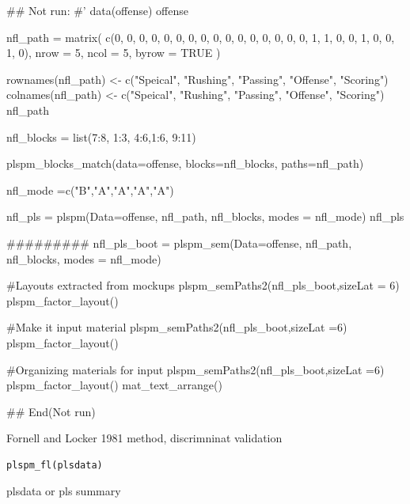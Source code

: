 \documentclass[a4paper]{book}
\begin{document}
\begin{Examples}
\begin{ExampleCode}

\#\# Not run: 
#'
data(offense)
offense %

nfl_path = matrix(
  c(0, 0, 0, 0, 0,
    0, 0, 0, 0, 0,
    0, 0, 0, 0, 0,
    0, 1, 1, 0, 0,
    1, 0, 0, 1, 0),
  nrow = 5, ncol = 5, byrow = TRUE )

rownames(nfl_path) <- c("Speical", "Rushing", "Passing", "Offense", "Scoring")
colnames(nfl_path) <- c("Speical", "Rushing", "Passing", "Offense", "Scoring")
nfl_path

nfl_blocks = list(7:8, 1:3, 4:6,1:6, 9:11)

plspm_blocks_match(data=offense, blocks=nfl_blocks,
                   paths=nfl_path)

nfl_mode =c("B","A","A","A","A")

nfl_pls = plspm(Data=offense, nfl_path, nfl_blocks, modes = nfl_mode)
nfl_pls%

#########
nfl_pls_boot = plspm_sem(Data=offense, nfl_path, nfl_blocks, modes = nfl_mode)

#Layouts extracted from mockups
plspm_semPaths2(nfl_pls_boot,sizeLat = 6)%
  plspm_factor_layout()

#Make it input material
plspm_semPaths2(nfl_pls_boot,sizeLat =6)%
  plspm_factor_layout() %

#Organizing materials for input
plspm_semPaths2(nfl_pls_boot,sizeLat =6)%
  plspm_factor_layout() %
  mat_text_arrange()

## End(Not run)



\end{ExampleCode}
\end{Examples}
%
\begin{Description}
Fornell and Locker 1981 method, discrimninat validation
\end{Description}
%
\begin{Usage}
\begin{verbatim}
plspm_fl(plsdata)
\end{verbatim}
\end{Usage}
%
\begin{Arguments}
\begin{ldescription}
\item[\code{plsdata}] plsdata or pls summary
\end{ldescription}
\end{Arguments}
\end{document}
